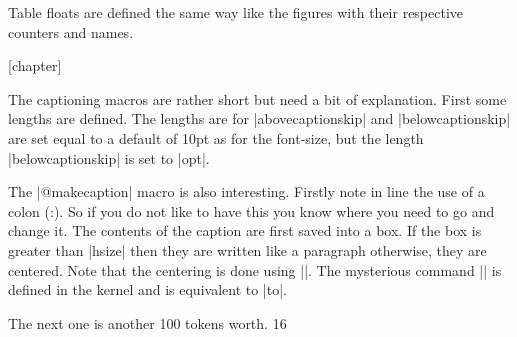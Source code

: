 \begin{multicols}{2}
 Table floats are defined the same way like the figures with their respective counters and names.  
\end{multicols}

\begin{teX}
[chapter]
\renewcommand \thetable
     {\ifnum \c@chapter>\z@ \thechapter.\fi \@arabic\c@table}
\def\fps@table{tbp}
\def\ftype@table{2}
\def\ext@table{lot}
\def\fnum@table{\tablename\nobreakspace\thetable}


\newenvironment{table}
               {\@float{table}}
               {\end@float}

\newenvironment{table*}
               {\@dblfloat{table}}
               {\end@dblfloat}
\end{teX}

\begin{multicols}{2}
The captioning macros are rather short but need a bit of explanation. First
some lengths are defined. The lengths are for |abovecaptionskip| and |belowcaptionskip| are set equal to a default of 10pt as for the font-size, but the length |belowcaptionskip| is set to |opt|.
\end{multicols}

\begin{teX}
\newlength\abovecaptionskip
\newlength\belowcaptionskip
\setlength{}
\setlength{}

\long{}
\end{teX}

\begin{multicols}{2}
The |@makecaption| macro is also interesting. Firstly note in line  the use of a colon (:). So if you do not like to have this you know where you need to go and change it. The contents of the caption are first saved into a box. If the box is greater than |hsize| then they are written like a paragraph otherwise, they are centered. Note that the centering is done using |\hfil\box\@tempoxa\hfil|. The mysterious command |\hb@xt| is defined in the kernel and is equivalent to |\hbox to|.
\end{multicols}

\begin{teX}
  \hb@xt@ The next one is another 100 tokens worth.
  16 \def\hb@xt@{\hbox to}
\end{teX}

